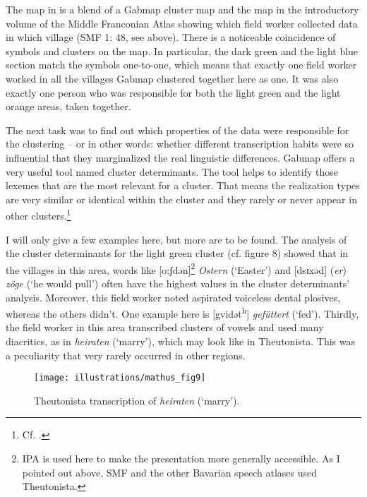 \documentclass[output=paper]{LSP/langsci}
\begin{document}
The map in  is a blend of a Gabmap cluster map and the map in the introductory volume of the Middle Franconian Atlas showing which field worker collected data in which village (SMF 1: 48, see  above). There is a noticeable coincidence  of symbols and clusters on the map. In particular, the dark green and the light blue section match the symbols one-to-one, which means that exactly one field worker worked in all the villages Gabmap clustered together here as one. It was also exactly one person who was responsible for both the light green and the light orange areas, taken together.

The next task was to find out which properties of the data were responsible for the clustering – or in other words: whether  different transcription habits were so influential that they marginalized the real linguistic differences. Gabmap offers a very useful tool named cluster determinants. The tool helps to identify those lexemes that are the most relevant for a cluster. That means the realization types are very similar or identical within the cluster and they rarely or never appear in other clusters.\footnote{Cf. \citet{nerbonne_gabmap_2011}.}

I will only give a few examples here, but more are to be found. The analysis of the cluster determinants for the light green cluster (cf. figure 8) showed that in the villages in this area, words like [o:ʃdən]\footnote{IPA is used here to make the presentation more generally accessible. As I pointed out above, SMF and the other Bavarian speech atlases used Theutonista.} \textit{Ostern} (`Easter') and [dsɪxəd] (\textit{er}) \textit{zöge} (`he would pull') often have the highest values in the cluster determinants' analysis. Moreover, this field worker noted aspirated voiceless dental plosives, whereas the others didn't. One example here is [gvidət\textsuperscript{h}] \textit{gefüttert} (`fed'). Thirdly, the field worker in this area transcribed clusters of vowels and used many diacritics, as in \textit{heiraten} (`marry'), which may look like  in Theutonista. This was a peculiarity that very rarely occurred in other regions.

\begin{figure}[t]
\texttt{[image: illustrations/mathus\_fig9]}
\caption{Theutonista transcription of \textit{heiraten} (`marry').}
\label{fig:mathus:9}
\end{figure}
\end{document}
